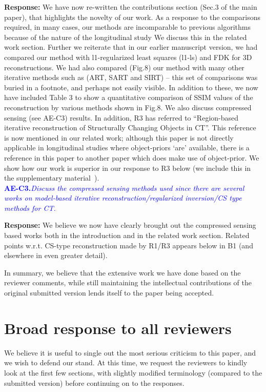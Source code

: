 \documentclass{article}
\begin{document}
\textbf{Response:} We have now re-written the contributions section (Sec.3 of the main paper), that highlights the novelty of our work.  
As a response to the comparisons required,  in many cases, our methods are incomparable to previous algorithms because of the nature of the longitudinal study  We discuss this in the related work section. Further we reiterate that in our earlier manuscript version, we had compared our method with l1-regularized least squares (l1-ls) and FDK for 3D reconstructions. We had also compared (Fig.8) our method with many other iterative methods such as (ART, SART and SIRT) -- this set of comparisons was buried in a footnote, and perhaps not easily visible.
In addition to these, we now have included Table 3 to show a quantitative comparison of SSIM values of the reconstruction by various methods shown in Fig.8.  We also discuss compressed sensing (see AE-C3) results.
In addition, 
R3 has referred to ``Region-based iterative reconstruction of Structurally Changing Objects in CT''. This reference is now mentioned in our related work; although this paper is not directly applicable in longitudinal studies where object-priors `are' available, there is a reference in this paper to another paper which does make use of object-prior. We show how our work is superior in our response to R3 below (we include this in the supplementary material~\cite{supp_paper}). \\

\textcolor{blue}{\textbf{AE-C3.}\textit{Discuss the compressed sensing methods used since there are several works on model-based iterative reconstruction/regularized inversion/CS type methods for CT.}}

\textbf{Response:} We believe we now have clearly brought out the compressed sensing based works both in the introduction and in the related work section.  Related points w.r.t. CS-type reconstruction made by R1/R3 appears below in B1 (and elsewhere in even greater detail).

In summary, we believe that the extensive work we have done based on the reviewer comments, while still maintaining the intellectual contributions of the original submitted version lends itself to the paper being accepted.

\section{Broad response to all reviewers}

We believe it is useful to single out the most serious criticism to this paper, and we wish to defend our stand. At this time, we request the reviewers  to kindly look at the first few sections, with slightly modified terminology (compared to the submitted version)  before continuing on to the responses. 
\end{document}
